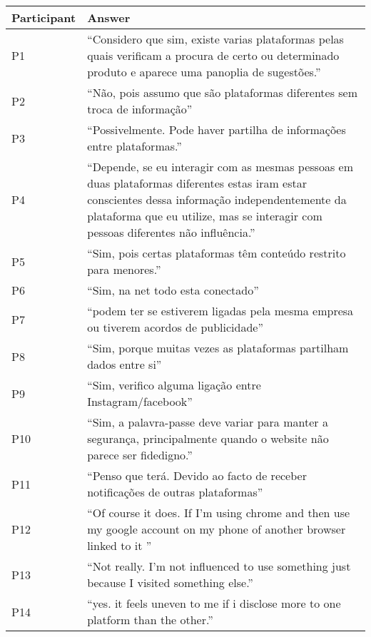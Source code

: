 \begin{table}[H]
    \begin{longtable}{p{3cm} p{13cm}}
        \hline
        \textbf{Participant} & \textbf{Answer} \\
        \hline
        P1 & ``Considero que sim, existe varias plataformas pelas quais verificam a procura de certo ou determinado produto e aparece uma panoplia de sugestões.'' \\
        \hline
        P2 & ``Não, pois assumo que são plataformas diferentes sem troca de informação'' \\
        \hline
        P3 & ``Possivelmente. Pode haver partilha de informações entre plataformas.'' \\
        \hline
        P4 & ``Depende, se eu interagir com as mesmas pessoas em duas plataformas diferentes estas iram estar conscientes dessa informação independentemente da plataforma que eu utilize, mas se interagir com pessoas diferentes não influência.'' \\
        \hline
        P5 & ``Sim, pois certas plataformas têm conteúdo restrito para menores.'' \\
        \hline
        P6 & ``Sim, na net todo esta conectado'' \\
        \hline
        P7 & ``podem ter se estiverem ligadas pela mesma empresa ou tiverem acordos de publicidade'' \\
        \hline
        P8 & ``Sim, porque muitas vezes as plataformas partilham dados entre si'' \\
        \hline
        P9 & ``Sim, verifico alguma ligação entre Instagram/facebook'' \\
        \hline
        P10 & ``Sim, a palavra-passe deve variar para manter a segurança, principalmente quando o website não parece ser fidedigno.'' \\
        \hline
        P11 & ``Penso que terá. Devido ao facto de receber notificações de outras plataformas'' \\
        \hline
        P12 & ``Of course it does. If I'm using chrome and then use my google account on my phone of another browser linked to it '' \\
        \hline
        P13 & ``Not really. I'm not influenced to use something just because I visited something else.'' \\
        \hline
        P14 & ``yes. it feels uneven to me if i disclose more to one platform than the other.'' \\

\end{longtable}
\end{table}
